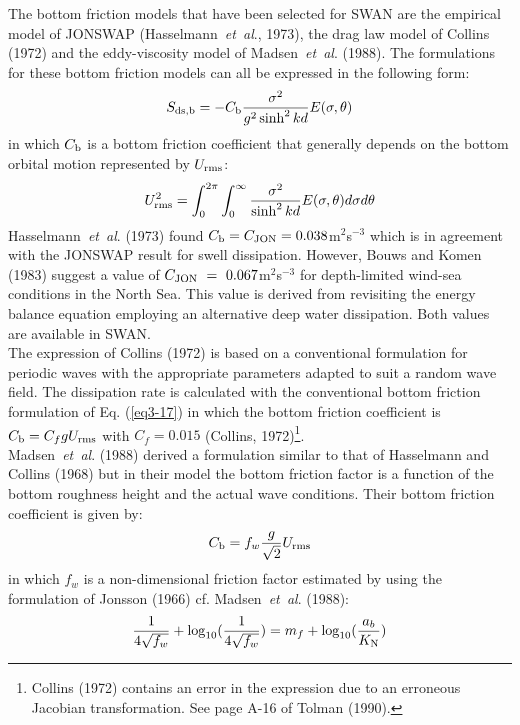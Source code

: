 \documentclass[12pt]{book}
\begin{document}
The bottom friction models that have been selected for SWAN are the empirical model of JONSWAP
(Hasselmann~{\it et~al}., 1973), the drag law model of Collins (1972) and the eddy-viscosity model of
Madsen~{\it et~al}. (1988). The formulations for these bottom friction models can all be expressed in the following form:
\begin{equation}
  S_{\rm ds,b} = -C_{\rm b} \frac{\sigma^2}{g^2 \sinh^2 kd} E (\sigma,\theta)
  \label{eq3-17}
\end{equation}
in which $C_{\rm b}$ is a bottom friction coefficient that generally depends on the bottom orbital motion
represented by $U_{\rm rms}$:
\begin{equation}
  U^2_{\rm rms} = \int_{0}^{2\pi} \int_{0}^{\infty} \frac{\sigma^2}{\sinh^2 kd} E(\sigma,\theta) d\sigma d\theta
  \label{eq3-18}
\end{equation}
Hasselmann~{\it et~al}. (1973) found $C_{\rm b}=C_{\rm JON}=0.038$m$^{2}$s$^{-3}$ which is in
agreement with the JONSWAP result for swell dissipation. However, Bouws and Komen (1983) suggest a
value of $C_{\rm JON}~=~0.067$m$^{2}$s$^{-3}$ for depth-limited wind-sea conditions in the North Sea. This value is derived
from revisiting the energy balance equation employing an alternative deep water dissipation.
Both values are available in SWAN.
\\[2ex]
\noindent
The expression of Collins (1972) is based on a conventional formulation for periodic waves with the
appropriate parameters adapted to suit a random wave field. The dissipation rate is calculated with the
conventional bottom friction formulation of Eq. (\ref{eq3-17}) in which the bottom friction coefficient is
$C_{\rm b} = C_f g U_{\rm rms}$ with $C_f = 0.015$ (Collins, 1972)\footnote{Collins (1972) contains
an error in the expression due to an erroneous Jacobian transformation. See page A-16 of Tolman (1990).}.
\\[2ex]
\noindent
Madsen~{\it et~al}. (1988) derived a formulation similar to that of Hasselmann and Collins (1968) but in their
model the bottom friction factor is a function of the bottom roughness height and the actual wave
conditions. Their bottom friction coefficient is given by:
\begin{equation}
  C_{\rm b} = f_w \frac{g}{\sqrt{2}} U_{\rm rms}
  \label{eq3-19}
\end{equation}
in which $f_w$ is a non-dimensional friction factor estimated by using the formulation of Jonsson (1966) cf.
Madsen~{\it et~al}. (1988):
\begin{equation}
  \frac{1}{4\sqrt{f_w}} + \log_{10} (\frac{1}{4\sqrt{f_w}}) = m_f + \log_{10} (\frac{a_b}{K_{\rm N}})
  \label{eq3-20}
\end{equation}
\end{document}
